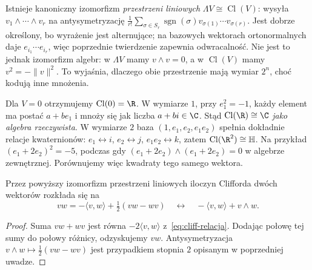 \begin{uwaga}
\label{rem:cliff-zewnetrzna}
Istnieje kanoniczny izomorfizm \emph{przestrzeni liniowych}
$\Lambda V\cong\operatorname{Cl}(V)$: wysyła
$v_1\wedge\cdots\wedge v_r$ na antysymetryzację
$\frac1{r!}\sum_{\sigma\in S_r}\operatorname{sgn}(\sigma)
 v_{\sigma(1)}\cdots v_{\sigma(r)}$.
Jest dobrze określony, bo wyrażenie jest alternujące;
na bazowych wektorach ortonormalnych daje
$e_{i_1}\cdots e_{i_r}$, więc poprzednie twierdzenie
zapewnia odwracalność. Nie jest to jednak izomorfizm
algebr: w $\Lambda V$ mamy $v\wedge v=0$,
a w $\operatorname{Cl}(V)$ mamy
$v^2=-\|v\|^2$. To wyjaśnia, dlaczego obie
przestrzenie mają wymiar $2^n$, choć kodują
inne mnożenia.
\end{uwaga}

\begin{przyklad}[Wymiary $0$, $1$ i $2$]
Dla $V=0$ otrzymujemy $\operatorname{Cl}(0)=\R$.
W wymiarze $1$, przy $e_1^2=-1$, każdy element
ma postać $a+be_1$ i mnoży się jak liczba
$a+bi\in\C$. Stąd $\operatorname{Cl}(\R)\cong\C$
\emph{jako algebra rzeczywista}.
W wymiarze $2$ baza $(1,e_1,e_2,e_1e_2)$
spełnia dokładnie relacje kwaternionów:
$e_1\leftrightarrow i$, $e_2\leftrightarrow j$,
$e_1e_2\leftrightarrow k$, zatem
$\operatorname{Cl}(\R^2)\cong\mathbb H$.
Na przykład $(e_1+2e_2)^2=-5$, podczas gdy
$(e_1+2e_2)\wedge(e_1+2e_2)=0$
w algebrze zewnętrznej. Porównujemy więc kwadraty tego samego wektora.
\end{przyklad}

\begin{stwierdzenie}
\label{prop:cliff-wedge}
Przez powyższy izomorfizm przestrzeni liniowych
iloczyn Clifforda dwóch wektorów rozkłada się na
\begin{equation}\label{eq:cliff-rozdzial}
 vw=-\langle v,w\rangle
       +\tfrac12(vw-wv)
 \quad\longleftrightarrow\quad
 -\langle v,w\rangle+v\wedge w.
\end{equation}
\end{stwierdzenie}
\begin{proof}
Suma $vw+wv$ jest równa
$-2\langle v,w\rangle$ z~\eqref{eq:cliff-relacja}.
Dodając połowę tej sumy do połowy różnicy,
odzyskujemy $vw$. Antysymetryzacja
$v\wedge w\mapsto\tfrac12(vw-wv)$
jest przypadkiem stopnia $2$ opisanym w
poprzedniej uwadze.
\end{proof}

